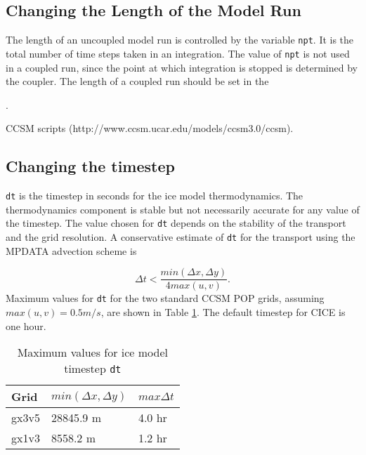 \subsection{Changing the Length of the Model Run}

The length of an uncoupled model run is controlled by the variable {\tt npt}.
It is the total number of time steps taken in an integration.  The value
of {\tt npt} is not used in a coupled run, since the point at which integration
is stopped is determined by the coupler.  The length of a coupled run should be
set in the 
\begin{htmlonly}
  .
\end{htmlonly}
\begin{htmlonly}
  CCSM scripts (http://www.ccsm.ucar.edu/models/ccsm3.0/ccsm).
\end{htmlonly}

\subsection{Changing the timestep}
\label{nml_time_mgmt}

{\tt dt} is the timestep in seconds for the ice model thermodynamics.
The thermodynamics component is stable but not necessarily accurate for any value
of the timestep.  The value chosen for {\tt dt} depends on the stability of the
transport and the grid resolution.  A conservative estimate of {\tt dt} for the
transport using the MPDATA advection scheme is

\begin{equation}
  \Delta t < \frac{min(\Delta x, \Delta y)}{4 max(u, v)} .
\end{equation}
Maximum values for {\tt dt} for the two standard CCSM POP grids, assuming 
$max(u,v) = 0.5 m/s$, are shown in Table \ref{table:max_dt}.  The default
timestep for CICE is one hour.

\begin{table}
  \begin{center}
  \caption{Maximum values for ice model timestep {\tt dt}}
  \label{table:max_dt}
  \begin{tabular}{lll} \hline
  Grid & $min(\Delta x, \Delta y)$ & $max \Delta t$   \\
  \hline \hline

gx3v5   & 28845.9 m & 4.0 hr \\
gx1v3   &  8558.2 m & 1.2 hr \\

  \hline
  \end{tabular}
  \end{center}
\end{table}

